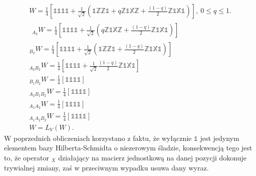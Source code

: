 \documentclass[10pt]{article} %
\newcommand{\X}{\mathbb{X}}
\newcommand{\Z}{\mathbb{Z}}
\newcommand{\I}{\mathbb{1}}
\begin{document}
\begin{gather}
W = \frac{1}{4}\left[
\I\I\I\I + \frac{1}{\sqrt{2}}(\I\Z\Z\I + q\Z\I\X\Z + \frac{(1-q)}{2}\Z\I\X\I)
\right],~ 0 \leq q \leq 1. \\ 
\begin{split}
{}_{A_2} W =  \frac{1}{4}\left[
\I\I\I\I + \frac{1}{\sqrt{2}}(q\Z\I\X\Z + \frac{(1-q)}{2}\Z\I\X\I)
\right]
\end{split} \\
{}_{B_2}W =  \frac{1}{4}\left[
\I\I\I\I + \frac{1}{\sqrt{2}}(\I\Z\Z\I + \frac{(1-q)}{2}\Z\I\X\I)
\right] \\
{}_{A_2B_2}W = 
 \frac{1}{4}\left[
\I\I\I\I + \frac{1}{\sqrt{2}}\frac{(1-q)}{2}\Z\I\X\I
\right] \\
{}_{B_1B_2}W =  \frac{1}{4}\left[
\I\I\I\I
\right]\\
{}_{A_2B_1B_2}W =  \frac{1}{4}\left[
\I\I\I\I
\right]\\
{}_{A_1A_2}W =  \frac{1}{4}\left[
\I\I\I\I
\right]\\
{}_{A_1A_2B_2}W =  \frac{1}{4}\left[
\I\I\I\I
\right] \\
W = L_V(W).
\end{gather} W poprzednich obliczeniach korzystano z faktu, że wyłącznie $\I$ jest jedynym elementem bazy Hilberta-Schmidta o niezerowym śladzie, konsekwencją tego jest to, że operator ${}_X$ działający na macierz jednostkową na danej pozycji dokonuje trywialnej zmiany, zaś w przeciwnym wypadku usuwa dany wyraz.
\end{document}
